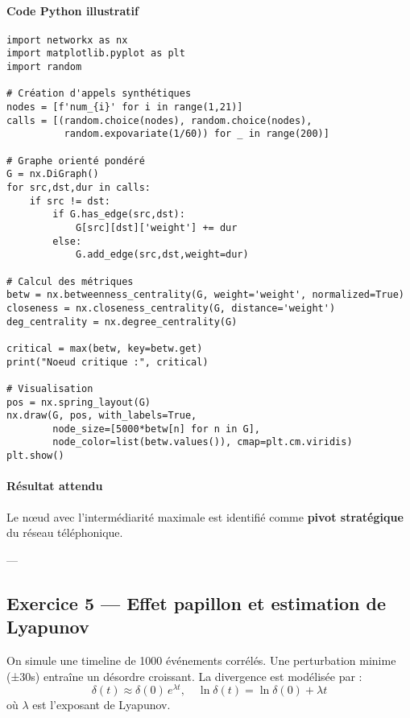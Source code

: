 \documentclass[11pt]{article}
\begin{document}
\paragraph{Code Python illustratif}
\begin{lstlisting}
import networkx as nx
import matplotlib.pyplot as plt
import random

# Création d'appels synthétiques
nodes = [f'num_{i}' for i in range(1,21)]
calls = [(random.choice(nodes), random.choice(nodes),
          random.expovariate(1/60)) for _ in range(200)]

# Graphe orienté pondéré
G = nx.DiGraph()
for src,dst,dur in calls:
    if src != dst:
        if G.has_edge(src,dst):
            G[src][dst]['weight'] += dur
        else:
            G.add_edge(src,dst,weight=dur)

# Calcul des métriques
betw = nx.betweenness_centrality(G, weight='weight', normalized=True)
closeness = nx.closeness_centrality(G, distance='weight')
deg_centrality = nx.degree_centrality(G)

critical = max(betw, key=betw.get)
print("Noeud critique :", critical)

# Visualisation
pos = nx.spring_layout(G)
nx.draw(G, pos, with_labels=True,
        node_size=[5000*betw[n] for n in G],
        node_color=list(betw.values()), cmap=plt.cm.viridis)
plt.show()
\end{lstlisting}

\paragraph{Résultat attendu}
Le nœud avec l’intermédiarité maximale est identifié comme \textbf{pivot stratégique} du réseau téléphonique.  

---

\subsection{Exercice 5 — Effet papillon et estimation de Lyapunov}

On simule une timeline de 1000 événements corrélés. Une perturbation minime (±30s) entraîne un désordre croissant.  
La divergence est modélisée par :
\[
\delta(t) \approx \delta(0)\,e^{\lambda t}, 
\quad \ln \delta(t) = \ln \delta(0) + \lambda t
\]
où $\lambda$ est l’exposant de Lyapunov.
\end{document}
